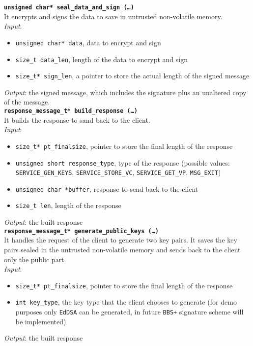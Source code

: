 \noindent
\texttt{\bfseries unsigned char* seal\_data\_and\_sign (\dots)}\\
It encrypts and signs the data to save in untrusted non-volatile memory. \\
\textit{Input}:
\begin{itemize}[noitemsep,nolistsep]
  \item \texttt{unsigned char* data}, data to encrypt and sign
  \item \texttt{size\_t data\_len}, length of the data to encrypt and sign
  \item \texttt{size\_t* sign\_len}, a pointer to store the actual length of the signed message
\end{itemize}
\textit{Output}: the signed message, which includes the signature plus an unaltered copy of the message. \\


\noindent
\texttt{\bfseries response\_message\_t* build\_response (\dots)}\\
It builds the response to sand back to the client. \\
\textit{Input}:
\begin{itemize}[noitemsep,nolistsep]
\item \texttt{size\_t* pt\_finalsize}, pointer to store the final length of the response
\item \texttt{unsigned short response\_type}, type of the response (possible values: \texttt{SERVICE\_\-GEN\_KEYS}, \texttt{SERVICE\_STORE\_VC}, \texttt{SERVICE\_GET\_VP}, \texttt{MSG\_EXIT})
\item \texttt{unsigned char *buffer}, response to send back to the client
\item \texttt{size\_t len}, length of the response
\end{itemize}
\textit{Output}: the built response \\


\noindent
\texttt{\bfseries response\_message\_t* generate\_public\_keys (\dots)}\\
It handles the request of the client to generate two key pairs. It saves the key pairs sealed in the untrusted non-volatile memory and sends back to the client only the public part. \\ 
\textit{Input}:
\begin{itemize}[noitemsep,nolistsep]
\item \texttt{size\_t* pt\_finalsize}, pointer to store the final length of the response
\item \texttt{int key\_type}, the key type that the client chooses to generate (for demo purposes only \texttt{EdDSA} can be generated, in future \texttt{BBS+} signature scheme will be implemented)
\end{itemize}
\textit{Output}: the built response \\

